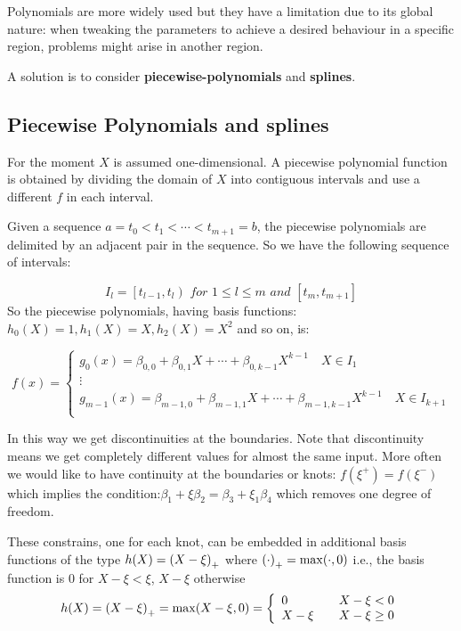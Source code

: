 \documentclass[12pt, letterpaper]{article}
\theoremstyle{definition}
\DeclarePairedDelimiter\autobracket{(}{)}
\newcommand{\br}[1]{\autobracket*{#1}}
\begin{document}
Polynomials are more widely used but they have a limitation due to its global nature: when tweaking the  parameters to achieve a desired behaviour in a specific region, problems might arise in another region.

A solution is to consider \textbf{piecewise-polynomials} and \textbf{splines}.

\subsection{Piecewise Polynomials and splines}
For the moment $X$ is assumed one-dimensional. A piecewise polynomial function is obtained by  dividing the domain of $X$ into contiguous intervals and use a different $f$ in each interval.

Given a sequence $a=t_0<t_1<\cdots<t_{m+1}=b$, the piecewise polynomials are delimited by an adjacent pair in the sequence. So we have the following sequence of intervals:

\begin{equation}
I_l = \left[ t_{l-1}, t_l\right) \textit{ for } 1\le l\le m \textit{ and } \left[t_m, t_{m+1}\right]
\end{equation}
So the piecewise polynomials, having basis functions: $h_0(X) = 1, h_1(X) = X, h_2(X) = X^2$ and so on, is:

\begin{equation}
f(x) = \left\{ \begin{array}{ll} g_0(x) = \beta_{0,0} + \beta_{0,1} X + \cdots + \beta_{0,k-1} X^{k-1}\quad X \in I_1 \\ 
\vdots\\
 g_{m-1}(x) = \beta_{m-1,0} + \beta_{m-1,1} X + \cdots + \beta_{m-1,k-1} X^{k-1}\quad X \in I_{k+1} \\  \quad 
\end{array}
 \right.
\end{equation}

In this way we get discontinuities at the boundaries. Note that discontinuity means we get completely different values for almost the same input. More often we would like to have continuity at the boundaries or knots: $f(\xi^+)=f(\xi^-)$ which implies the condition:$\beta_1 +\xi\beta_2 = \beta_3 +\xi_1\beta_4$ which removes one degree of freedom.

These constrains, one for each knot, can be embedded in additional basis functions of the type $h(X) = \br{X - \xi}_+$ where $\br{\cdot}_+ = \max(\cdot, 0)$ i.e., the basis function is $0$ for $X - \xi<\xi$, $X - \xi$ otherwise
\begin{equation}
h(X) = \br{X - \xi}_+ = \max(X - \xi, 0) = \left\{ \begin{array}{ll}  0 &\quad X-\xi<0\\
X-\xi &\quad X-\xi\ge0
\end{array}
 \right.
\end{equation}
\end{document}
